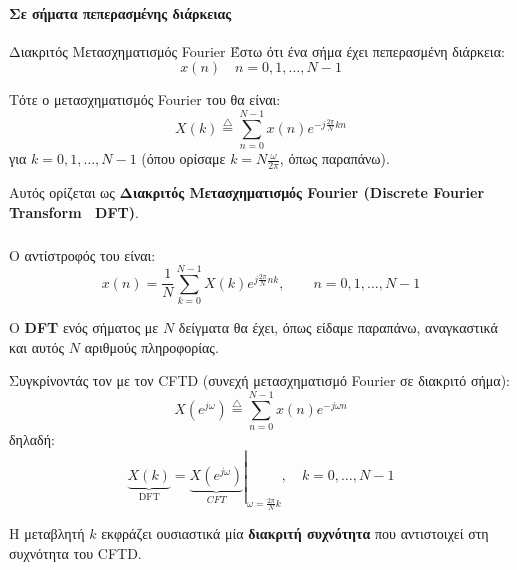 \documentclass[11pt,a4paper,notitlepage,fleqn]{article}
\begin{document}
\paragraph{Σε σήματα πεπερασμένης διάρκειας} \hspace{0pt}

\begin{defn}[label=defn:dft]{Διακριτός Μετασχηματισμός Fourier}{}
	Έστω ότι ένα σήμα έχει πεπερασμένη διάρκεια:
	\[
	x(n) \quad n = 0,1,\dots, N-1
	\]
	
	Τότε ο μετασχηματισμός Fourier του θα είναι:
	\[
	X(k) \overset{\triangle}{=} \sum_{n=0}^{N-1}
	x(n) e^{-j\frac{2π}{N} kn}
	\] για \( k=0,1,\dots,N-1 \) (όπου ορίσαμε \( k = N \frac{\omega}{2\pi} \), όπως παραπάνω).
	
	Αυτός ορίζεται ως \textbf{Διακριτός Μετασχηματισμός Fourier (Discrete Fourier Transform \textemdash~DFT)}.
\end{defn}

\subparagraph{}
Ο αντίστροφός του είναι:
\[
x(n) = \frac{1}{N} \sum_{k=0}^{N-1} X(k) e^{j\frac{2\pi}{N}nk},\qquad n=0,1,\dots,N-1
\]

Ο \textbf{DFT} ενός σήματος με \( N \) δείγματα θα έχει, όπως είδαμε παραπάνω, αναγκαστικά και αυτός
\( N \) αριθμούς πληροφορίας.

Συγκρίνοντάς τον με τον CFTD (συνεχή μετασχηματισμό Fourier σε διακριτό σήμα):
\[
X\left(e^{j\omega }\right) \overset{\triangle}{=} \sum_{n=0}^{N-1} x(n)e^{-j\omega n}
\]
δηλαδή:
\[
\underbrace{X(k)}_{\text{DFT}} = \left. \underbrace{X\left(e^{j\omega }\right)}_{CFT} \right|_{\omega = \frac{2π}{N}k},\quad k=0,\dots,N-1
\]

Η μεταβλητή \( k \) εκφράζει ουσιαστικά μία \textbf{διακριτή συχνότητα} που αντιστοιχεί στη συχνότητα του CFTD.
\end{document}
